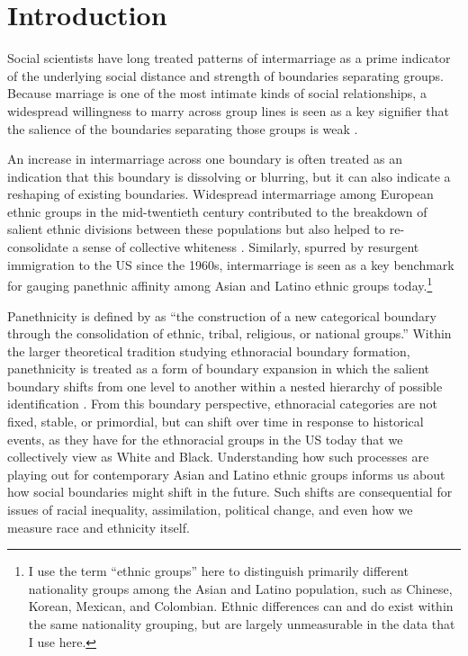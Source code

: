 \documentclass[11pt,]{article}
\newlength{\normalparindent}
\begin{document}
\vskip 6.5pt

\noindent \newpage\doublespacing\raggedright\setlength{\parindent}{\normalparindent} \hypertarget{introduction}{%
\section{Introduction}\label{introduction}}

Social scientists have long treated patterns of intermarriage as a prime indicator of the underlying social distance and strength of boundaries separating groups. Because marriage is one of the most intimate kinds of social relationships, a widespread willingness to marry across group lines is seen as a key signifier that the salience of the boundaries separating those groups is weak \citep{gordon_assimilation_1964}.

An increase in intermarriage across one boundary is often treated as an indication that this boundary is dissolving or blurring, but it can also indicate a reshaping of existing boundaries. Widespread intermarriage among European ethnic groups in the mid-twentieth century contributed to the breakdown of salient ethnic divisions between these populations but also helped to re-consolidate a sense of collective whiteness \citep{lieberson_many_1988, alba_ethnic_1990, jacobsen_whiteness_1998}. Similarly, spurred by resurgent immigration to the US since the 1960s, intermarriage is seen as a key benchmark for gauging panethnic affinity among Asian and Latino ethnic groups today.\footnote{I use the term ``ethnic groups'' here to distinguish primarily different nationality groups among the Asian and Latino population, such as Chinese, Korean, Mexican, and Colombian. Ethnic differences can and do exist within the same nationality grouping, but are largely unmeasurable in the data that I use here.}

Panethnicity is defined by \citet{okamoto_panethnicity_2014a} as ``the construction of a new categorical boundary through the consolidation of ethnic, tribal, religious, or national groups.'' Within the larger theoretical tradition studying ethnoracial boundary formation, panethnicity is treated as a form of boundary expansion in which the salient boundary shifts from one level to another within a nested hierarchy of possible identification \citep{wimmer_making_2008}. From this boundary perspective, ethnoracial categories are not fixed, stable, or primordial, but can shift over time in response to historical events, as they have for the ethnoracial groups in the US today that we collectively view as White and Black. Understanding how such processes are playing out for contemporary Asian and Latino ethnic groups informs us about how social boundaries might shift in the future. Such shifts are consequential for issues of racial inequality, assimilation, political change, and even how we measure race and ethnicity itself.
\end{document}
